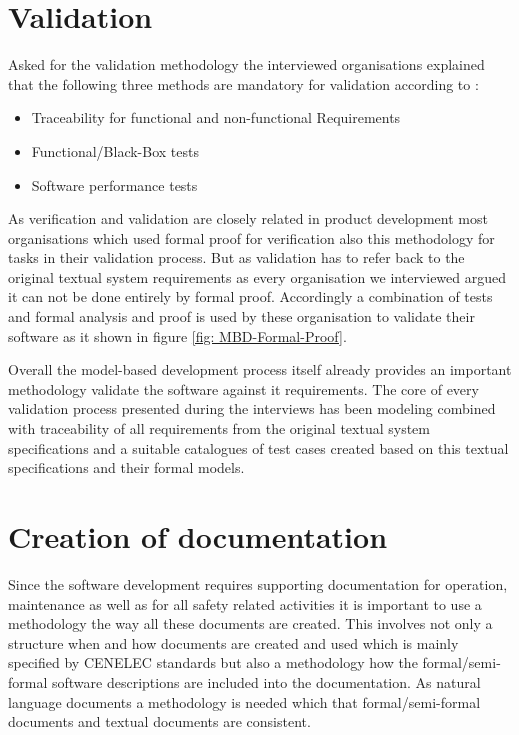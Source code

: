 \documentclass{./template/openetcs_report}
\begin{document}
\section{Validation}

Asked for the validation methodology the interviewed organisations explained that the following three methods are mandatory for validation according to \citeauthor{EN50128:2011}:

\vspace{-10pt}
\begin{itemize}[topsep=2pt, partopsep=2pt,itemsep=2pt,parsep=2pt]
\item Traceability for functional and non-functional Requirements
\item Functional/Black-Box tests
\item Software performance tests
\end{itemize}

As verification and validation are closely related in product development most organisations which used formal proof for verification also this methodology for tasks in their validation process. But as validation has to refer back to the original textual system requirements as every organisation we interviewed argued it can not be done entirely by formal proof. Accordingly a combination of tests and formal analysis and proof is used by these organisation to validate their software as it shown in figure \ref{fig: MBD-Formal-Proof}. 

Overall the model-based development process itself already provides an important methodology validate the software against it requirements. The core of every validation process presented during the interviews has been modeling combined with traceability of all requirements from the original textual system specifications and a suitable catalogues of test cases created based on this textual specifications and their formal models.

\section{Creation of documentation}

Since the software development requires supporting documentation for operation, maintenance as well as for all safety related activities it is important to use a methodology the way all these documents are created. This involves not only a structure when and how documents are created and used which is mainly specified by CENELEC standards but also a methodology how the formal/semi-formal software descriptions are included into the documentation. As natural language documents a methodology is needed which that formal/semi-formal documents and textual documents are consistent.
\end{document}

